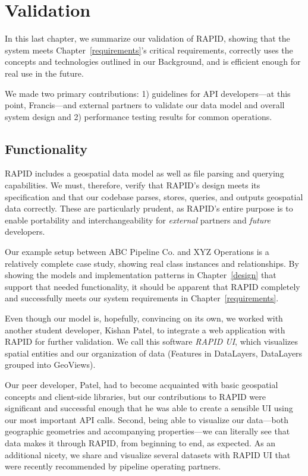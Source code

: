 \chapter{Validation}
\label{validation}
In this last chapter, we summarize our validation of RAPID, showing that the system meets Chapter~\ref{requirements}'s critical requirements, correctly uses the concepts and technologies outlined in our Background, and is efficient enough for real use in the future.

We made two primary contributions: 1) guidelines for API developers---at this point, Francis---and external partners to validate our data model and overall system design and 2) performance testing results for common operations.

\section{Functionality}
RAPID includes a geospatial data model as well as file parsing and querying capabilities. We must, therefore, verify that RAPID's design meets its specification and that our codebase parses, stores, queries, and outputs geospatial data correctly. These are particularly prudent, as RAPID's entire purpose is to enable portability and interchangeability for \textit{external} partners and \textit{future} developers.

Our example setup between ABC Pipeline Co. and XYZ Operations is a relatively complete case study, showing real class instances and relationships. By showing the models and implementation patterns in Chapter~\ref{design} that support that needed functionality, it should be apparent that RAPID completely and successfully meets our system requirements in Chapter~\ref{requirements}.

Even though our model is, hopefully, convincing on its own, we worked with another student developer, Kishan Patel, to integrate a web application with RAPID for further validation. We call this software \textit{RAPID UI}, which visualizes spatial entities and our organization of data (Features in DataLayers, DataLayers grouped into GeoViews).

Our peer developer, Patel, had to become acquainted with basic geospatial concepts and client-side libraries, but our contributions to RAPID were significant and successful enough that he was able to create a sensible UI using our most important API calls. Second, being able to visualize our data---both geographic geometries and accompanying properties---we can literally see that data makes it through RAPID, from beginning to end, as expected. As an additional nicety, we share and visualize several datasets with RAPID UI that were recently recommended by pipeline operating partners.

